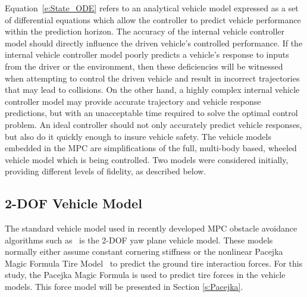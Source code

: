 \documentclass[12pt,onecolumn]{report}
\newcommand{\CHRONO}{{\sffamily{{Chrono}}}}
\begin{document}
Equation~\eqref{e:State_ODE} refers to an analytical vehicle model expressed as a set of differential equations which allow the controller to predict vehicle performance within the prediction horizon. The accuracy of the internal vehicle controller model should directly influence the driven vehicle's controlled performance. If the internal vehicle controller model poorly predicts a vehicle's response to inputs from the driver or the environment, then these deficiencies will be witnessed when attempting to control the driven vehicle and result in incorrect trajectories that may lead to collisions. On the other hand, a highly complex internal vehicle controller model may provide accurate trajectory and vehicle response predictions, but with an unacceptable time required to solve the optimal control problem. An ideal controller should not only accurately predict vehicle responses, but also do it quickly enough to insure vehicle safety. The vehicle models embedded in the MPC are simplifications of the full, multi-body based, {\CHRONO} wheeled vehicle model which is being controlled.  Two models were considered initially, providing different levels of fidelity, as described below.


\subsection{2-DOF Vehicle Model}\label{ss:2DOFModel}
The standard vehicle model used in recently developed MPC obstacle avoidance algorithms such as~\cite{ModelFidelity2016} is the 2-DOF yaw plane vehicle model. These models normally either assume constant cornering stiffness or the nonlinear Pacejka Magic Formula Tire Model~\cite{Pacejka2012} to predict the ground tire interaction forces. For this study, the Pacejka Magic Formula is used to predict tire forces in the vehicle models. This force model will be presented in Section \ref{s:Pacejka}.   
\end{document}

